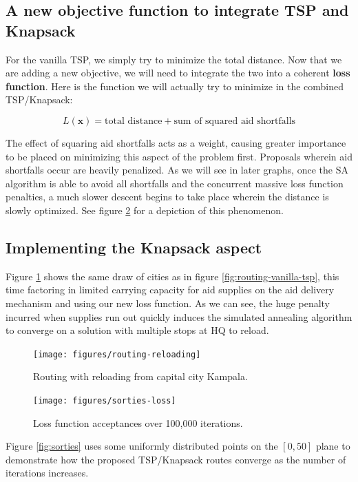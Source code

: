\documentclass{article} %
\begin{document}
\subsection{A new objective function to integrate TSP and Knapsack}

For the vanilla TSP, we simply try to minimize the total distance. Now that we are adding a new objective, we will need to integrate the two into a coherent \textbf{loss function}.  Here is the function we will actually try to minimize in the combined TSP/Knapsack:

$$L(\boldsymbol x) = \text{total distance} + \text{sum of squared aid shortfalls}$$

The effect of squaring aid shortfalls acts as a weight, causing greater importance to be placed on minimizing this aspect of the problem first. Proposals wherein aid shortfalls occur are heavily penalized. As we will see in later graphs, once the SA algorithm is able to avoid all shortfalls and the concurrent massive loss function penalties, a much slower descent begins to take place wherein the distance is slowly optimized. See figure \ref{fig:sorties-loss} for a depiction of this phenomenon.

\subsection{Implementing the Knapsack aspect}

Figure \ref{fig:routing-reloading} shows the same draw of cities as in figure \ref{fig:routing-vanilla-tsp}, this time factoring in limited carrying capacity for aid supplies on the aid delivery mechanism and using our new loss function. As we can see, the huge penalty incurred when supplies run out quickly induces the simulated annealing algorithm to converge on a solution with multiple stops at HQ to reload.

\begin{figure}[h]
  \centering
  \texttt{[image: figures/routing-reloading]}
  \caption{Routing with reloading from capital city Kampala.}
  \label{fig:routing-reloading}
\end{figure}

\begin{figure}[h]
  \centering
  \texttt{[image: figures/sorties-loss]}
  \caption{Loss function acceptances over 100,000 iterations.}
  \label{fig:sorties-loss}
\end{figure}

Figure \ref{fig:sorties} uses some uniformly distributed points on the $[0,50]$ plane to demonstrate how the proposed TSP/Knapsack routes converge as the number of iterations increases.
\end{document}
